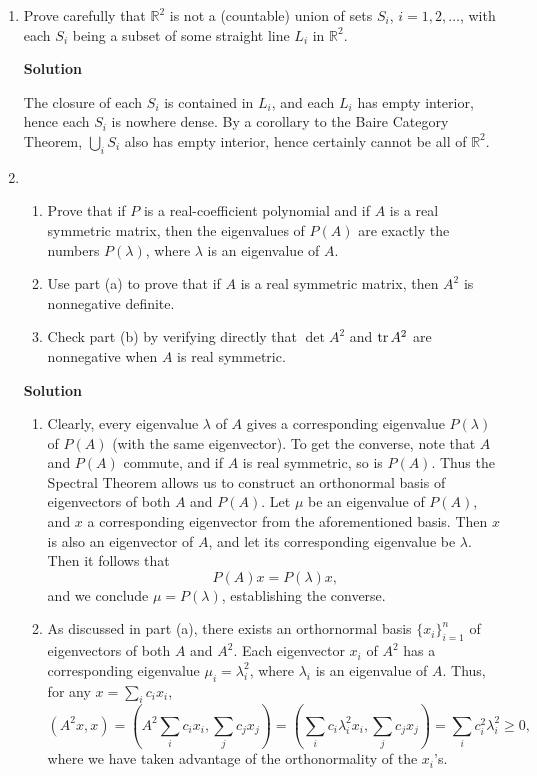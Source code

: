 \documentclass{article}
\def\tr{\mathop{\rm tr}\nolimits}
\begin{document}
\begin{enumerate}
\item Prove carefully that \(\mathbb{R}^2\) is not a (countable) union of sets \(S_i\), \(i = 1, 2, \ldots\), with each \(S_i\) being a subset of some straight line \(L_i\) in \(\mathbb{R}^2\).

{\bf Solution}

The closure of each \(S_i\) is contained in \(L_i\), and each \(L_i\) has empty interior, hence each \(S_i\) is nowhere dense.  By a corollary to the Baire Category Theorem, \(\bigcup_i S_i\) also has empty interior, hence certainly cannot be all of \(\mathbb{R}^2\).



\item

\begin{enumerate}
\item Prove that if \(P\) is a real-coefficient polynomial and if \(A\) is a real symmetric matrix, then the eigenvalues of \(P(A)\) are exactly the numbers \(P(\lambda)\), where \(\lambda\) is an eigenvalue of \(A\).

\item Use part (a) to prove that if \(A\) is a real symmetric matrix, then \(A^2\) is nonnegative definite.

\item Check part (b) by verifying directly that \(\det A^2\) and \(\tr A^2\) are nonnegative when \(A\) is real symmetric.

\end{enumerate}

{\bf Solution}

\begin{enumerate}
\item Clearly, every eigenvalue \(\lambda\) of \(A\) gives a corresponding eigenvalue \(P(\lambda)\) of \(P(A)\) (with the same eigenvector).  To get the converse, note that \(A\) and \(P(A)\) commute, and if \(A\) is real symmetric, so is \(P(A)\).  Thus the Spectral Theorem allows us to construct an orthonormal basis of eigenvectors of both \(A\) and \(P(A)\).  Let \(\mu\) be an eigenvalue of \(P(A)\), and \(x\) a corresponding eigenvector from the aforementioned basis.  Then \(x\) is also an eigenvector of \(A\), and let its corresponding eigenvalue be \(\lambda\).  Then it follows that
\[P(A)x = P(\lambda)x,\]
and we conclude \(\mu = P(\lambda)\), establishing the converse.

\item As discussed in part (a), there exists an orthornormal basis \(\{x_i\}_{i = 1}^n\) of eigenvectors of both \(A\) and \(A^2\).  Each eigenvector \(x_i\) of \(A^2\) has a corresponding eigenvalue \(\mu_i = \lambda_i^2\), where \(\lambda_i\) is an eigenvalue of \(A\).  Thus, for any \(x = \sum_i c_i x_i\),
\[(A^2x,x) = \left( A^2 \sum_i c_i x_i, \sum_j c_j x_j \right)
           = \left( \sum_i c_i \lambda_i^2 x_i, \sum_j c_j x_j \right)
           = \sum_i c_i^2 \lambda_i^2
        \geq 0,\]
where we have taken advantage of the orthonormality of the \(x_i\)'s.


\end{enumerate}
\end{enumerate}
\end{document}
